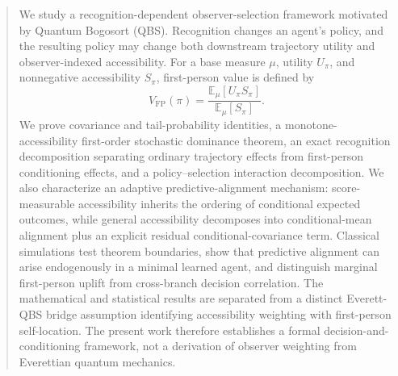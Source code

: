 \begin{abstract}
We study a recognition-dependent observer-selection framework motivated by Quantum Bogosort (QBS). Recognition changes an agent's policy, and the resulting policy may change both downstream trajectory utility and observer-indexed accessibility. For a base measure $\mu$, utility $U_\pi$, and nonnegative accessibility $S_\pi$, first-person value is defined by
\[
V_{\mathrm{FP}}(\pi)=\frac{\mathbb E_\mu[U_\pi S_\pi]}{\mathbb E_\mu[S_\pi]}.
\]
We prove covariance and tail-probability identities, a monotone-accessibility first-order stochastic dominance theorem, an exact recognition decomposition separating ordinary trajectory effects from first-person conditioning effects, and a policy--selection interaction decomposition. We also characterize an adaptive predictive-alignment mechanism: score-measurable accessibility inherits the ordering of conditional expected outcomes, while general accessibility decomposes into conditional-mean alignment plus an explicit residual conditional-covariance term. Classical simulations test theorem boundaries, show that predictive alignment can arise endogenously in a minimal learned agent, and distinguish marginal first-person uplift from cross-branch decision correlation. The mathematical and statistical results are separated from a distinct Everett-QBS bridge assumption identifying accessibility weighting with first-person self-location. The present work therefore establishes a formal decision-and-conditioning framework, not a derivation of observer weighting from Everettian quantum mechanics.
\end{abstract}
